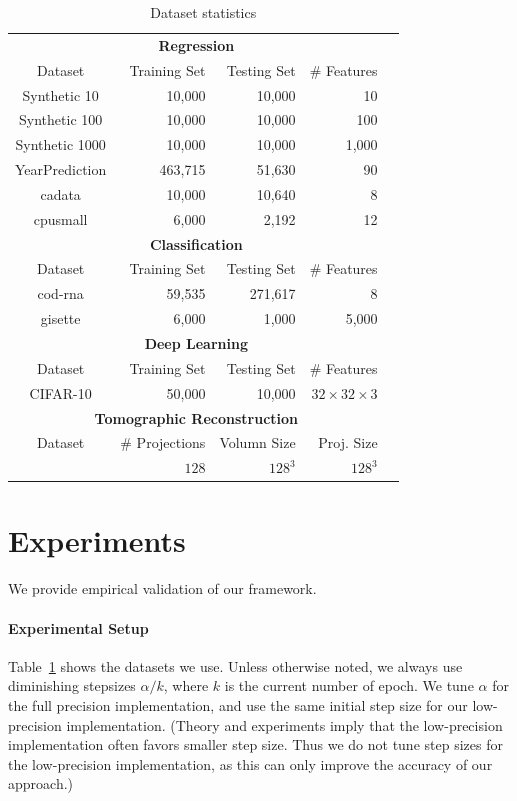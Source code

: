 \documentclass{article}
\begin{document}
\begin{table}[t]
\small
\centering
\begin{tabular}{crrrr}
\hline
\multicolumn{4}{c}{\bf Regression}\\
Dataset           & Training Set & Testing Set & \# Features  \\
\hline
Synthetic 10   & 10,000        & 10,000       & 10               \\
Synthetic 100  & 10,000        & 10,000       & 100              \\
Synthetic 1000 & 10,000        & 10,000       & 1,000           \\
YearPrediction & 463,715       & 51,630       & 90                  \\
cadata         & 10,000        & 10,640       & 8                   \\
cpusmall       & 6,000         & 2,192        & 12     \\
\hline
\hline
\multicolumn{4}{c}{\bf Classification}\\
Dataset           & Training Set & Testing Set & \# Features \\
\hline
cod-rna        & 59,535        & 271,617      & 8    \\
gisette        & 6,000         & 1,000        & 5,000  \\  
\hline
\hline
\multicolumn{4}{c}{\bf Deep Learning}\\
Dataset           & Training Set & Testing Set & \# Features \\
\hline
CIFAR-10        & 50,000        & 10,000      &$32\times 32\times 3$     \\
\hline
\hline
\multicolumn{4}{c}{\bf Tomographic Reconstruction}\\
Dataset           & \# Projections & Volumn Size & Proj. Size \\
\hline
                  & $128$            & $128^3$      & $128^3$     \\
\hline
\end{tabular}
\caption{Dataset statistics}
\label{table:dataset}
\end{table}

\section{Experiments} \label{sec:exp}

We provide empirical validation of
our framework.

\paragraph{Experimental Setup} 
Table~\ref{table:dataset} shows the 
datasets we use. 
Unless otherwise noted, we always
use diminishing stepsizes $\alpha/k$,
where $k$ is the current number of
epoch. We tune 
$\alpha$ for the full precision
implementation, and use the
same initial step size for 
our low-precision 
implementation. (Theory and
experiments imply that the low-precision
implementation often favors smaller step size. 
Thus we do not tune step sizes for the low-precision 
implementation, as this can only improve the accuracy of our approach.) 
\end{document}
